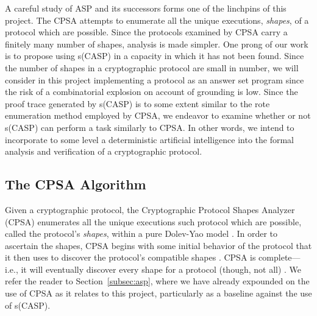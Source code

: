 \documentclass[11pt]{article}
\begin{document}
A careful study of ASP and its successors forms one of the linchpins of this project. The CPSA attempts to enumerate all the unique executions, \textit{shapes}, of a protocol which are possible. Since the protocols examined by CPSA carry a finitely many number of shapes, analysis is made simpler. One prong of our work is to propose using s(CASP) in a capacity in which it has not been found. Since the number of shapes in a cryptographic protocol are small in number, we will consider in this project implementing a protocol as an answer set program since the risk of a combinatorial explosion on account of grounding is low. Since the proof trace generated by s(CASP) is to some extent similar to the rote enumeration method employed by CPSA, we endeavor to examine whether or not s(CASP) can perform a task similarly to CPSA. In other words, we intend to incorporate to some level a deterministic artificial intelligence into the formal analysis and verification of a cryptographic protocol. 


\subsection{The CPSA Algorithm}
Given a cryptographic protocol, the Cryptographic Protocol Shapes Analyzer (CPSA) enumerates all the unique executions such protocol which are possible, called the protocol's \textit{shapes}, within a pure Dolev-Yao model \cite{1056650}. In order to ascertain the shapes, CPSA begins with some initial behavior of the protocol that it then uses to discover the protocol's compatible shapes \cite{10.1007/978-3-031-87496-3_10}. CPSA is complete—i.e., it will eventually discover every shape for a protocol (though, not all) \cite{1056650}. We refer the reader to Section~\ref{subsec:asp}, where we have already expounded on the use of CPSA as it relates to this project, particularly as a baseline against the use of s(CASP). 
\end{document}
